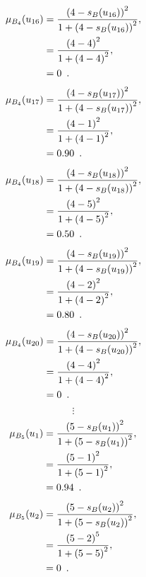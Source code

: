 \documentclass[a4paper,openany]{book}
\begin{document}
				\begin{align}
					\mu_{B_4}(u_{16}) &= \frac{\left(4-s_B(u_{16})\right)^2}{1 + \left(4-s_B(u_{16})\right)^2} ,\\
					&= \frac{\left(4-4\right)^2}{1 + \left(4-4\right)^2} \notag ,\\
					&= 0 \enspace. \notag
				\end{align}
				\begin{align}
					\mu_{B_4}(u_{17}) &= \frac{\left(4-s_B(u_{17})\right)^2}{1 + \left(4-s_B(u_{17})\right)^2} ,\\
					&= \frac{\left(4-1\right)^2}{1 + \left(4-1\right)^2} \notag ,\\
					&= 0.90 \enspace. \notag
				\end{align}
				\begin{align}
					\mu_{B_4}(u_{18}) &= \frac{\left(4-s_B(u_{18})\right)^2}{1 + \left(4-s_B(u_{18})\right)^2} ,\\
					&= \frac{\left(4-5\right)^2}{1 + \left(4-5\right)^2} \notag ,\\
					&= 0.50 \enspace. \notag
				\end{align}
				\begin{align}
					\mu_{B_4}(u_{19}) &= \frac{\left(4-s_B(u_{19})\right)^2}{1 + \left(4-s_B(u_{19})\right)^2} ,\\
					&= \frac{\left(4-2\right)^2}{1 + \left(4-2\right)^2} \notag ,\\
					&= 0.80 \enspace. \notag
				\end{align}
				\begin{align}
					\mu_{B_4}(u_{20}) &= \frac{\left(4-s_B(u_{20})\right)^2}{1 + \left(4-s_B(u_{20})\right)^2} ,\\
					&= \frac{\left(4-4\right)^2}{1 + \left(4-4\right)^2} \notag ,\\
					&= 0 \enspace. \notag
				\end{align}
				\[
					\vdots
				\]
				\begin{align}
					\mu_{B_5}(u_1) &= \frac{\left(5-s_B(u_1)\right)^2}{1 + \left(5-s_B(u_1)\right)^2} ,\\
					&= \frac{\left(5-1\right)^2}{1 + \left(5-1\right)^2} \notag ,\\
					&= 0.94 \enspace. \notag
				\end{align}
				\begin{align}
					\mu_{B_5}(u_2) &= \frac{\left(5-s_B(u_2)\right)^2}{1 + \left(5-s_B(u_2)\right)^2} ,\\
					&= \frac{\left(5-2\right)^5}{1 + \left(5-5\right)^2} \notag ,\\
					&= 0 \enspace. \notag
				\end{align}
\end{document}
